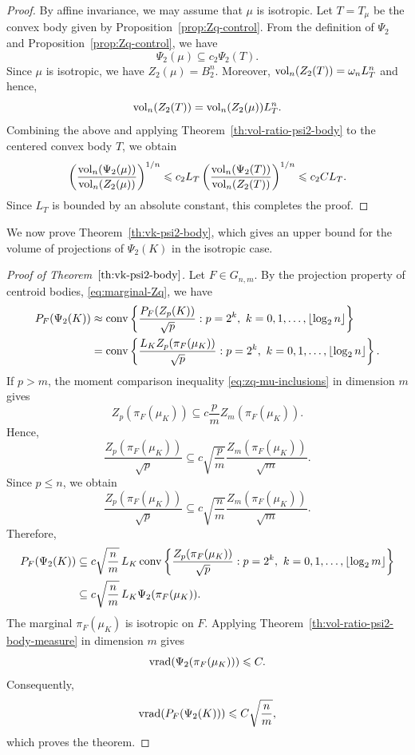 \documentclass[11pt,leqno]{article}
\theoremstyle{definition}
\numberwithin{equation}{section}
\newcommand{\ls}{\leqslant}
\begin{document}
\begin{proof}By affine invariance, we may assume that $\mu$ is isotropic. Let
$T=T_\mu$ be the convex body given by Proposition~\ref{prop:Zq-control}.
From the definition of $\Psi_2$ and Proposition~\ref{prop:Zq-control}, we have
\begin{equation}\label{eq:body-measure}\Psi_2(\mu)\subseteq c_2\Psi_2(T).\end{equation} 
Since $\mu$ is isotropic, we have $Z_2(\mu)=B_2^n$. Moreover, ${\rm vol}_n(Z_2(T))=\omega_nL_T^n$ and hence,
\[{\rm vol}_n(Z_2(T))={\rm vol}_n(Z_2(\mu))L_T^n.\]
Combining the above and applying Theorem~\ref{th:vol-ratio-psi2-body} to the centered convex body $T$, we obtain
\[\left(\frac{{\rm vol}_n(\Psi_{2}(\mu))}{{\rm vol}_n(Z_{2}(\mu))}\right)^{1/n}
\ls c_2L_T\left(\frac{{\rm vol}_n(\Psi_2(T))}{{\rm vol}_n(Z_2(T))}\right)^{1/n}
\ls c_2CL_T.\]
Since $L_T$ is bounded by an absolute constant, this completes the proof. 
\end{proof}


\medskip 

We now prove Theorem~\ref{th:vk-psi2-body}, which gives an upper bound for
the volume of projections of $\Psi_2(K)$ in the isotropic case.

\begin{proof}[Proof of Theorem~$\ref{th:vk-psi2-body}$]
Let $F\in G_{n,m}$. By the projection property of centroid bodies, \eqref{eq:marginal-Zq}, we have
\begin{align*}P_F(\Psi_2(K))&\approx {\rm conv}\left\{\frac{P_F(Z_p(K))}{\sqrt p}:p=2^k,\ k=0,1,\ldots,\lfloor\log_2n\rfloor\right\}\\
&={\rm conv}\left\{\frac{L_KZ_p(\pi_F(\mu_K))}{\sqrt p}:p=2^k,\ k=0,1,\ldots,\lfloor\log_2n\rfloor\right\}.
\end{align*}
If $p>m$, the moment comparison inequality \eqref{eq:zq-mu-inclusions} in dimension $m$ gives
\[Z_p(\pi_F(\mu_K))\subseteq c\frac{p}{m}Z_m(\pi_F(\mu_K)).\]
Hence,
\[\frac{Z_p(\pi_F(\mu_K))}{\sqrt p}\subseteq c\sqrt{\frac pm}\frac{Z_m(\pi_F(\mu_K))}{\sqrt m}.\]
Since $p\ls n$, we obtain
\[\frac{Z_p(\pi_F(\mu_K))}{\sqrt p}\subseteq c\sqrt{\frac nm}\frac{Z_m(\pi_F(\mu_K))}{\sqrt m}.\]
Therefore,
\begin{align*}
P_F(\Psi_2(K))&\subseteq c\sqrt{\frac nm}\,L_K\,{\rm conv}\left\{\frac{Z_p(\pi_F(\mu_K))}{\sqrt p}: p=2^k,\ k=0,1,\ldots,\lfloor\log_2m\rfloor\right\}\\
&\subseteq c\sqrt{\frac nm}\,L_K\Psi_2(\pi_F(\mu_K)).
\end{align*}
The marginal $\pi_F(\mu_K)$ is isotropic on $F$. Applying Theorem~\ref{th:vol-ratio-psi2-body-measure} in dimension $m$ gives
\[{\rm vrad}(\Psi_2(\pi_F(\mu_K)))\ls C.\]
Consequently,
\[{\rm vrad}(P_F(\Psi_2(K)))\ls C\sqrt{\frac nm},\]
which proves the theorem.
\end{proof}
\end{document}
